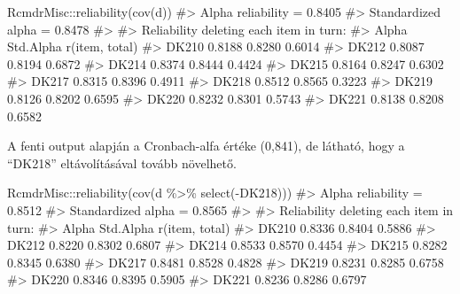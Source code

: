 \documentclass[
  letterpaper,
]{krantz}
\makeatletter
\newenvironment{Shaded}{\begin{snugshade}}{\end{snugshade}}
\newcommand{\CommentTok}[1]{\textcolor[rgb]{0.37,0.37,0.37}{#1}}
\newcommand{\FunctionTok}[1]{\textcolor[rgb]{0.28,0.35,0.67}{#1}}
\newcommand{\NormalTok}[1]{\textcolor[rgb]{0.00,0.23,0.31}{#1}}
\newcommand{\SpecialCharTok}[1]{\textcolor[rgb]{0.37,0.37,0.37}{#1}}
\newenvironment{kframe}{%
\medskip{}
\setlength{\fboxsep}{.8em}
 \def\at@end@of@kframe{}%
 \ifinner\ifhmode%
  \def\at@end@of@kframe{\end{minipage}}%
  \begin{minipage}{\columnwidth}%
 \fi\fi%
 \def\FrameCommand##1{\hskip\@totalleftmargin \hskip-\fboxsep
 \colorbox{shadecolor}{##1}\hskip-\fboxsep
     \hskip-\linewidth \hskip-\@totalleftmargin \hskip\columnwidth}%
 \MakeFramed {\advance\hsize-\width
   \@totalleftmargin\z@ \linewidth\hsize
   \@setminipage}}%
 {\par\unskip\endMakeFramed%
 \at@end@of@kframe}
\renewenvironment{Shaded}{\begin{kframe}}{\end{kframe}}
\makeatother
\begin{document}
\begin{Shaded}
\begin{Highlighting}[]
\NormalTok{RcmdrMisc}\SpecialCharTok{::}\FunctionTok{reliability}\NormalTok{(}\FunctionTok{cov}\NormalTok{(d))}
\CommentTok{\#\textgreater{} Alpha reliability =  0.8405 }
\CommentTok{\#\textgreater{} Standardized alpha =  0.8478 }
\CommentTok{\#\textgreater{} }
\CommentTok{\#\textgreater{} Reliability deleting each item in turn:}
\CommentTok{\#\textgreater{}        Alpha Std.Alpha r(item, total)}
\CommentTok{\#\textgreater{} DK210 0.8188    0.8280         0.6014}
\CommentTok{\#\textgreater{} DK212 0.8087    0.8194         0.6872}
\CommentTok{\#\textgreater{} DK214 0.8374    0.8444         0.4424}
\CommentTok{\#\textgreater{} DK215 0.8164    0.8247         0.6302}
\CommentTok{\#\textgreater{} DK217 0.8315    0.8396         0.4911}
\CommentTok{\#\textgreater{} DK218 0.8512    0.8565         0.3223}
\CommentTok{\#\textgreater{} DK219 0.8126    0.8202         0.6595}
\CommentTok{\#\textgreater{} DK220 0.8232    0.8301         0.5743}
\CommentTok{\#\textgreater{} DK221 0.8138    0.8208         0.6582}
\end{Highlighting}
\end{Shaded}

A fenti output alapján a Cronbach-alfa értéke (0,841), de látható, hogy
a ``DK218'' eltávolításával tovább növelhető.

\begin{Shaded}
\begin{Highlighting}[]
\NormalTok{RcmdrMisc}\SpecialCharTok{::}\FunctionTok{reliability}\NormalTok{(}\FunctionTok{cov}\NormalTok{(d }\SpecialCharTok{\%\textgreater{}\%}
    \FunctionTok{select}\NormalTok{(}\SpecialCharTok{{-}}\NormalTok{DK218)))}
\CommentTok{\#\textgreater{} Alpha reliability =  0.8512 }
\CommentTok{\#\textgreater{} Standardized alpha =  0.8565 }
\CommentTok{\#\textgreater{} }
\CommentTok{\#\textgreater{} Reliability deleting each item in turn:}
\CommentTok{\#\textgreater{}        Alpha Std.Alpha r(item, total)}
\CommentTok{\#\textgreater{} DK210 0.8336    0.8404         0.5886}
\CommentTok{\#\textgreater{} DK212 0.8220    0.8302         0.6807}
\CommentTok{\#\textgreater{} DK214 0.8533    0.8570         0.4454}
\CommentTok{\#\textgreater{} DK215 0.8282    0.8345         0.6380}
\CommentTok{\#\textgreater{} DK217 0.8481    0.8528         0.4828}
\CommentTok{\#\textgreater{} DK219 0.8231    0.8285         0.6758}
\CommentTok{\#\textgreater{} DK220 0.8346    0.8395         0.5905}
\CommentTok{\#\textgreater{} DK221 0.8236    0.8286         0.6797}
\end{Highlighting}
\end{Shaded}
\end{document}
